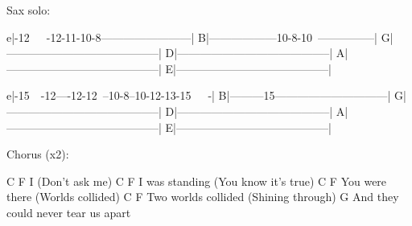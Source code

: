 Sax solo:

e|-12~~~-12-11-10-8------------------------|
B|------------------10-8-10~---------------|
G|-----------------------------------------|
D|-----------------------------------------|
A|-----------------------------------------|
E|-----------------------------------------|

e|-15~~-12----12-12~--10-8--10-12-13-15~~~-|
B|---------15------------------------------|
G|-----------------------------------------|
D|-----------------------------------------|
A|-----------------------------------------|
E|-----------------------------------------|


Chorus (x2):

C         F
I (Don't ask me)
      C                        F
I was standing (You know it's true)
         C                 F
You were there (Worlds collided)
             C                F
Two worlds collided (Shining through)
               G
And they could never tear us apart

